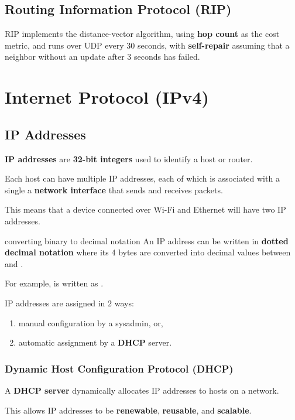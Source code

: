 \subsection{Routing Information Protocol (RIP)}
RIP implements the distance-vector algorithm, using \textbf{hop count} as the cost metric,
and runs over UDP every 30 seconds, with \textbf{self-repair} assuming that
a neighbor without an update after 3 seconds has failed.


\section{Internet Protocol (IPv4)}

\subsection{IP Addresses}
\textbf{IP addresses} are \textbf{32-bit integers} used to identify a host or router.

Each host can have multiple IP addresses, each of which is associated with a single a \textbf{network interface}
that sends and receives packets.

This means that a device connected over Wi-Fi and Ethernet will have two IP addresses.

\begin{defn}{converting binary to decimal notation}
    An IP address can be written in \textbf{dotted decimal notation} where its 4 bytes
    are converted into decimal values between  and .

    For example,  is written as .
\end{defn}

IP addresses are assigned in 2 ways:
\begin{enumerate}
    \item manual configuration by a sysadmin, or,
    \item automatic assignment by a \textbf{DHCP} server.
\end{enumerate}

\subsubsection{Dynamic Host Configuration Protocol (DHCP)}
A \textbf{DHCP server} dynamically allocates IP addresses to hosts on a network.

This allows IP addresses to be \textbf{renewable}, \textbf{reusable}, and \textbf{scalable}.

